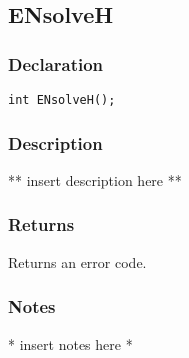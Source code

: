 \subsection{ENsolveH}
\subsubsection{Declaration}
\begin{lstlisting}
int ENsolveH();
\end{lstlisting}
\subsubsection{Description}
** insert description here **
\subsubsection{Returns}
Returns an error code.
\subsubsection{Notes}
* insert notes here *